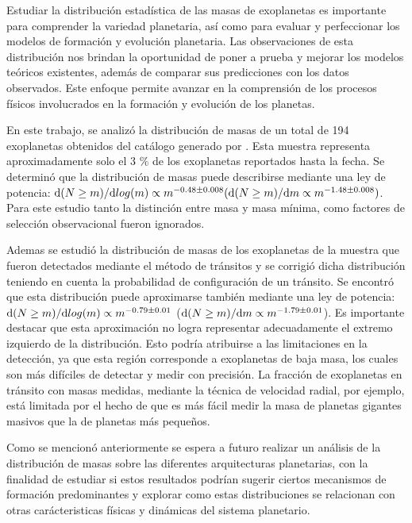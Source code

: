 \documentclass[baaa]{baaa}
\begin{document}
Estudiar la distribución estadística de las masas de exoplanetas es importante para comprender la variedad planetaria, así como para evaluar y perfeccionar los modelos de formación y evolución planetaria. Las observaciones de esta distribución nos brindan la oportunidad de poner a prueba y mejorar los modelos teóricos existentes, además de comparar sus predicciones con los datos observados. Este enfoque permite avanzar en la comprensión de los procesos físicos involucrados en la formación y evolución de los planetas.

En este trabajo, se analizó la distribución de masas de un total de 194 exoplanetas obtenidos del catálogo generado por \citet{mishra2023}. Esta muestra representa aproximadamente solo el 3 $\%$ de los exoplanetas reportados hasta la fecha. Se determinó que la distribución de masas puede describirse mediante una ley de potencia: $ {\rm d}(N \geq m)/{\rm d}log(m) \propto m^{-0.48 \pm 0.008} ({\rm d}(N\geq m)/{\rm d}m \propto m^{-1.48 \pm 0.008}) $. Para este estudio tanto la distinción entre masa y masa mínima, como factores de selección observacional fueron ignorados.  

Ademas se estudió la distribución de masas de los exoplanetas de la muestra que fueron detectados mediante el método de tránsitos y se corrigió dicha distribución teniendo en cuenta la probabilidad de configuración de un tránsito. Se encontró que esta distribución puede aproximarse también mediante una ley de potencia: $ {\rm d}(N \geq m)/{\rm d}log(m) \propto m^{-0.79 \pm 0.01 }$ (${\rm d}(N\geq m)/{\rm d}m \propto m^{-1.79 \pm 0.01 }$). Es importante destacar que esta aproximación no logra representar adecuadamente el extremo izquierdo de la distribución. Esto podría atribuirse a las limitaciones en la detección, ya que esta región corresponde a exoplanetas de baja masa, los cuales son más difíciles de detectar y medir con precisión. La fracción de exoplanetas en tránsito con masas medidas, mediante la técnica de velocidad radial, por ejemplo, está limitada por el hecho de que es más fácil medir la masa de planetas gigantes masivos que la de planetas más pequeños. 

Como se mencionó anteriormente se espera a futuro realizar un análisis de la distribución de masas sobre las diferentes arquitecturas planetarias, con la finalidad de estudiar si estos resultados podrían sugerir ciertos mecanismos de formación predominantes y explorar como estas distribuciones se relacionan con otras carácteristicas físicas y dinámicas del sistema planetario.
\end{document}
